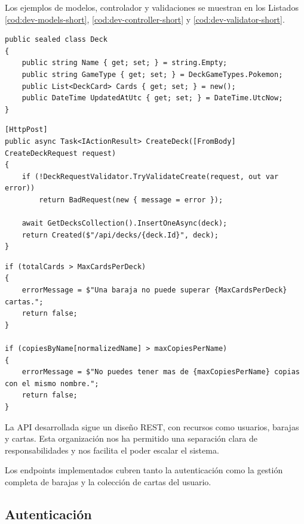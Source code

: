 Los ejemplos de modelos, controlador y validaciones se muestran en los Listados \ref{cod:dev-models-short}, \ref{cod:dev-controller-short} y \ref{cod:dev-validator-short}.

\begin{lstlisting}[language={[Sharp]C}, caption={Modelos de Deck y de User (C\#)}, label={cod:dev-models-short}, captionpos=b]
public sealed class Deck
{
    public string Name { get; set; } = string.Empty;
    public string GameType { get; set; } = DeckGameTypes.Pokemon;
    public List<DeckCard> Cards { get; set; } = new();
    public DateTime UpdatedAtUtc { get; set; } = DateTime.UtcNow;
}
\end{lstlisting}

\begin{lstlisting}[language={[Sharp]C}, caption={Ejemplo controlador (C\#)}, label={cod:dev-controller-short}, captionpos=b]
[HttpPost]
public async Task<IActionResult> CreateDeck([FromBody] CreateDeckRequest request)
{
    if (!DeckRequestValidator.TryValidateCreate(request, out var error))
        return BadRequest(new { message = error });

    await GetDecksCollection().InsertOneAsync(deck);
    return Created($"/api/decks/{deck.Id}", deck);
}
\end{lstlisting}

\begin{lstlisting}[language={[Sharp]C}, caption={Ejemplo validaciones (C\#)}, label={cod:dev-validator-short}, captionpos=b]
if (totalCards > MaxCardsPerDeck)
{
    errorMessage = $"Una baraja no puede superar {MaxCardsPerDeck} cartas.";
    return false;
}

if (copiesByName[normalizedName] > maxCopiesPerName)
{
    errorMessage = $"No puedes tener mas de {maxCopiesPerName} copias con el mismo nombre.";
    return false;
}
\end{lstlisting}

La API desarrollada sigue un diseño REST, con recursos como usuarios, barajas y cartas. Esta organización nos ha permitido una separación clara de responsabilidades y nos facilita el poder escalar el sistema.

Los endpoints implementados cubren tanto la autenticación como la gestión completa de barajas y la colección de cartas del usuario.

\subsection*{Autenticación}

